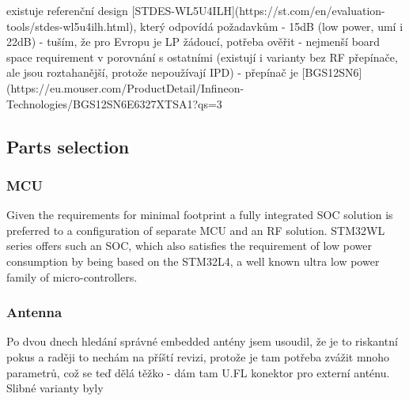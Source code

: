 existuje referenční design [STDES-WL5U4ILH](https://st.com/en/evaluation-tools/stdes-wl5u4ilh.html), který odpovídá požadavkům
	- 15dB (low power, umí i 22dB) - tuším, že pro Evropu je LP žádoucí, potřeba ověřit
	- nejmenší board space requirement v porovnání s ostatními (existují i varianty bez RF přepínače, ale jsou roztahanější, protože nepoužívají IPD)
	- přepínač je [BGS12SN6](https://eu.mouser.com/ProductDetail/Infineon-Technologies/BGS12SN6E6327XTSA1?qs=3%

\subsection{Parts selection}
\subsubsection{MCU}
Given the requirements for minimal footprint a fully integrated SOC solution is preferred to a configuration of separate MCU and an RF solution. STM32WL series offers such an SOC, which also satisfies the requirement of low power consumption by being based on the STM32L4, a well known ultra low power family of micro-controllers. 

\subsubsection{Antenna}
Po dvou dnech hledání správné embedded antény jsem usoudil, že je to riskantní pokus a raději to nechám na příští revizi, protože je tam potřeba zvážit mnoho parametrů, což se teď dělá těžko - dám tam U.FL konektor pro externí anténu. Slibné varianty byly

